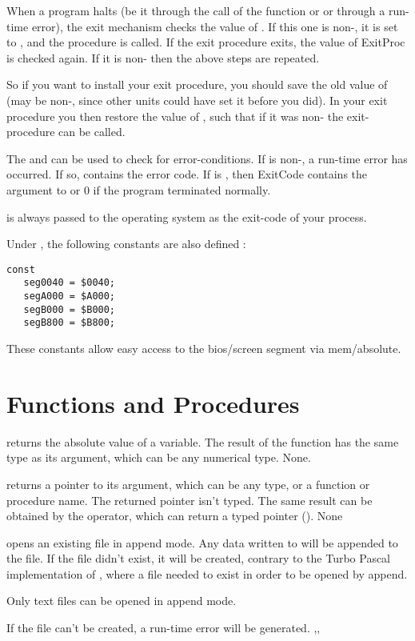 \documentclass{report}
\begin{document}
When a program halts (be it through the call of the  function or
 or through a run-time error), the exit mechanism checks the value
of . If this one is non-, it is set to , and
the procedure is called. If the exit procedure exits, the value of ExitProc
is checked again. If it is non- then the above steps are repeated.

So if you want to install your exit procedure, you should save the old value
of  (may be non-, since other units could have set it before 
you did). In your exit procedure you then restore the value of
, such that if it was non- the exit-procedure can be
called.

The  and  can be used to check for
error-conditions. If  is non-, a run-time error has
occurred. If so,  contains the error code. If  is
, then {ExitCode} contains the argument to  or 0 if the
program terminated normally.

 is always passed to the operating system as the exit-code of
your process.

Under , the following constants are also defined :
\begin{verbatim}
const
   seg0040 = $0040;
   segA000 = $A000;
   segB000 = $B000;
   segB800 = $B800;
\end{verbatim}
These constants allow easy access to the bios/screen segment via mem/absolute.

\section{Functions and Procedures}
{ returns the absolute value of a variable. The result of the
function has the same type as its argument, which can be any numerical
type.}
{None.}
{}



{ returns a pointer to its argument, which can be any type, or a
function or procedure name. The returned pointer isn't typed.
The same result can be obtained by the  operator, which can return a
typed pointer (\progref). }
{None}
{}



{ opens an existing file in append mode. Any data written to
 will be appended to the file. If the file didn't exist, it will be
created, contrary to the Turbo Pascal implementation of , where
a file needed to exist in order to be opened by
append.

Only text files can be opened in append mode.
}
{If the file can't be created, a run-time error will be generated.}
{,, }
\end{document}
